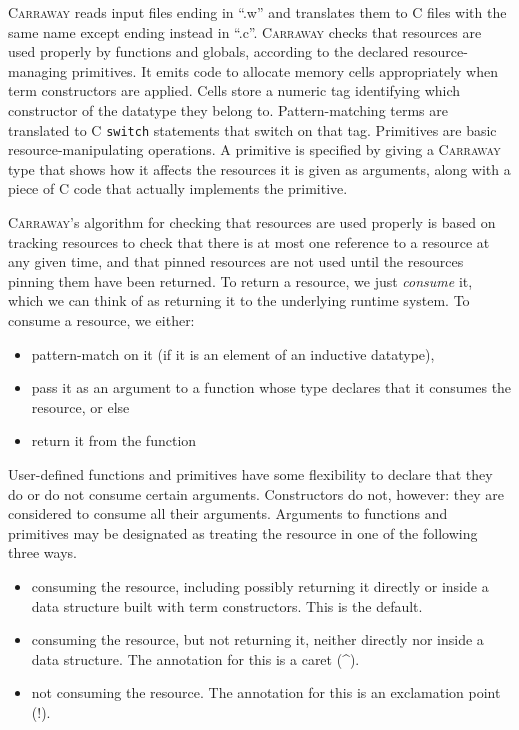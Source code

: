 \documentclass{book}[12pt]
\newcommand{\carraway}[0]{\textsc{Carraway}\xspace}
\begin{document}
\noindent \carraway reads input files ending in ``.w'' and translates
them to C files with the same name except ending instead in ``.c''.
\carraway checks that resources are used properly by functions and
globals, according to the declared resource-managing primitives.  It
emits code to allocate memory cells appropriately when term
constructors are applied.  Cells store a numeric tag identifying which
constructor of the datatype they belong to.  Pattern-matching terms
are translated to C \texttt{switch} statements that switch on that
tag.  Primitives are basic resource-manipulating operations.  A
primitive is specified by giving a \carraway type that shows how it
affects the resources it is given as arguments, along with a piece of
C code that actually implements the primitive.

\carraway's algorithm for checking that resources are used properly is
based on tracking resources to check that there is at most one
reference to a resource at any given time, and that pinned resources
are not used until the resources pinning them have been returned.  To
return a resource, we just \emph{consume} it, which we can think of as
returning it to the underlying runtime system.  To consume a resource,
we either:

\begin{itemize}
\item pattern-match on it (if it is an element of an inductive
datatype), 
\item pass it as an argument to a function whose type declares that it
consumes the resource, or else
\item return it from the function
\end{itemize}

\noindent User-defined functions and primitives have some flexibility
to declare that they do or do not consume certain arguments.
Constructors do not, however: they are considered to consume all their
arguments.  Arguments to functions and primitives may be designated as
treating the resource in one of the following three ways.

\begin{itemize}
\item consuming the resource, including possibly returning it directly
or inside a data structure built with term constructors.  This is the
default.
\item consuming the resource, but not returning it, neither directly
nor inside a data structure.  The annotation for this is a caret (\^{}).
\item not consuming the resource.  The annotation for this is an exclamation
point (!).
\end{itemize}
\end{document}
